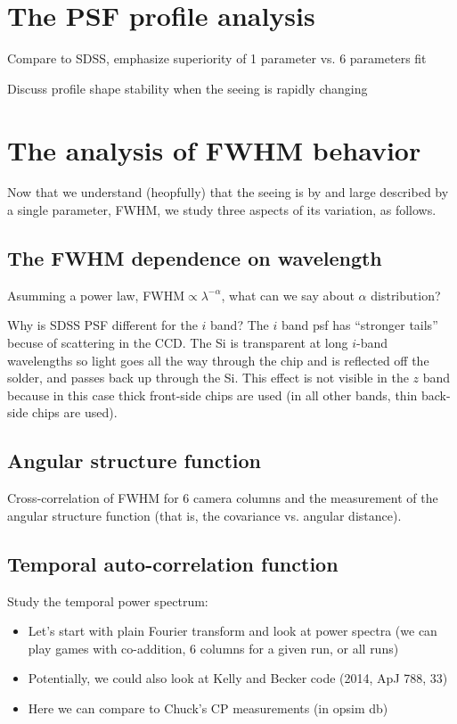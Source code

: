 \documentclass[12pt,preprint]{aastex}
\begin{document}
\section{The PSF profile analysis}

Compare to SDSS, emphasize superiority of 1 parameter vs. 6 parameters fit

Discuss profile shape stability when the seeing is rapidly  changing 


\section{The analysis of FWHM behavior} 

Now that we understand (heopfully) that the seeing is by and large described by 
a single parameter, FWHM, we study three aspects of its variation, as follows.


\subsection{The FWHM dependence on wavelength} 

Asumming a power law, FWHM$\propto \lambda^{-\alpha}$, what can we say 
about $\alpha$ distribution? 


Why is SDSS PSF different for the $i$ band? The $i$ band psf has ``stronger tails''
becuse of scattering in the CCD.  The Si is transparent at long $i$-band wavelengths 
so light goes all the way through the chip and is reflected off the solder, and passes 
back up through the Si. This effect is not visible in the $z$ band because in this case
thick front-side chips are used (in all other bands, thin back-side chips are used). 


\subsection{Angular structure function} 

Cross-correlation of FWHM for 6 camera columns and the measurement of the angular
structure function (that is, the covariance vs. angular distance). 


\subsection{Temporal auto-correlation function}

Study the temporal power spectrum:
\begin{itemize}
\item Let's start with plain Fourier transform and look at power spectra (we can 
    play games with co-addition, 6 columns for a given run, or all runs)
\item Potentially, we could also look at  Kelly and Becker code  (2014, ApJ 788, 33) 
\item Here we can compare to Chuck's CP measurements (in opsim db) 
\end{itemize} 
\end{document}
